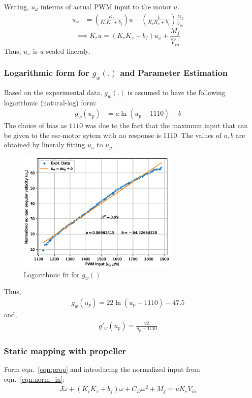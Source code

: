 Writing, $u_{\omega}$ interms of actual PWM input to the motor $u$.
\begin{align*}
    u_{\omega} &= \left(\frac{K_r}{K_r K_v  + b_f} \right) u - \left(\frac{1}{K_r K_v  + b_f} \right) \frac{M_f}{\hat V_{in}}
\end{align*}
\begin{equation}
    \implies K_r u = (K_r K_v  + b_f) u_\omega + \frac{M_f}{\hat V_{in}}
    \label{eqn:norm_in}
\end{equation}
Thus, $u_{\omega}$ is $u$ scaled lineraly.

\subsubsection{Logarithmic form for $g_w(.)$ and Parameter Estimation}

Based on the experimental data, $g_w(.)$ is assumed to have the following logarithmic (natural-log) form:
\begin{align*}
    g_w(u_p) &= a \ln(u_p - 1110) + b
\end{align*}
The choice of bias as $1110$ was due to the fact that the maximum input that can be given to the esc-motor sytem with no response is 1110. The values of $a, b$ are obtained by lineraly fitting $u_\omega$ to $u_p$.

\begin{figure}[H]
    \centering
    \includegraphics[width = 0.7\textwidth]{./figs/norm_omega/no-load_rpm.eps}
    \caption{Logarithmic fit for $g_w()$}
\end{figure}
Thus,
\begin{align*}
    \boxed{g_w(u_p) = 22 \ln(u_p - 1110)- 47.5 }
\end{align*}
and,
\begin{align*}
    g'_w(u_p) = \frac{22}{u_p - 1110}
\end{align*}


\subsubsection{Static mapping with propeller}
Form eqn.~\ref{eqn:prop} and introducing the normalized input from eqn.~\ref{eqn:norm_in}:
\begin{align*}
    J\dot \omega + (K_rK_v + b_f) \omega + C_D \omega^2 + M_f = u K_r V_{in}
\end{align*}
